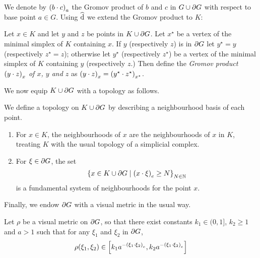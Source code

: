 \documentclass[a4paper]{article}
\begin{document}
We denote by $\gromov{a}{b}{c}$ the Gromov product of $b$ and $c$ in $G \union
\boundary G$ with respect to base point $a \in G$. Using $\newdist$ we extend
the Gromov product to $K$:

\begin{definition}
  Let $x \in K$ and let $y$ and $z$ be points in $K \union \boundary G$. Let
  $x^\star$ be a vertex of the minimal simplex of $K$ containing $x$. If $y$
  (respectively $z$) is in $\boundary G$ let $y^\star = y$ (respectively
  $z^\star = z$); otherwise let $y^\star$ (respectively $z^\star$) be a vertex
  of the minimal simplex of $K$ containing $y$ (respectively $z$.)
  Then define the \emph{Gromov product $\gromov{x}{y}{z}$ of $x$, $y$ and $z$}
  as $\gromov{x}{y}{z} = \gromov{x^\star}{y^\star}{z^\star}$.
\end{definition}

We now equip $K \union \boundary G$ with a topology as follows.

\begin{definition}
  We define a topology on $K \union \boundary G$ by describing a neighbourhood
  basis of each point.
  \begin{enumerate}
    \item For $x \in K$, the neighbourhoods of $x$ are the neighbourhoods of
      $x$ in $K$, treating $K$ with the usual topology of a simplicial complex.
    \item For $\xi \in \boundary G$, the set
      \begin{equation*}
        \set{x \in K \union \boundary G 
              \suchthat \gromov{e}{x}{\xi} \geq N}_{N\in\naturals}
      \end{equation*}
      is a fundamental system of neighbourhoods for the point $x$.
  \end{enumerate}
\end{definition}

Finally, we endow $\boundary G$ with a visual metric in the usual way.

\begin{definition}
  Let $\rho$ be a visual metric on $\boundary G$, so that there exist constants
  $k_1 \in (0,1]$, $k_2 \geq 1$ and $a > 1$ such that for any $\xi_1$ and
  $\xi_2$ in $\boundary G$,
  \begin{equation*}
    \rho(\xi_1, \xi_2) \in \left[k_1 a^{-\gromov{e}{\xi_1}{\xi_2}}, k_2
          a^{-\gromov{e}{\xi_1}{\xi_2}}\right]
  \end{equation*}
\end{definition}
\end{document}
